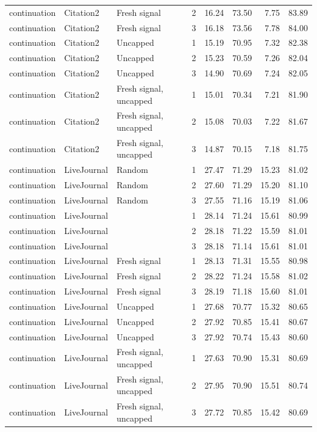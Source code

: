\begin{table}[t]
\begin{tabular}{lllrrrrr}
continuation & Citation2 & Fresh signal & 2 & 16.24 & 73.50 & 7.75 & 83.89 \\
continuation & Citation2 & Fresh signal & 3 & 16.18 & 73.56 & 7.78 & 84.00 \\
continuation & Citation2 & Uncapped & 1 & 15.19 & 70.95 & 7.32 & 82.38 \\
continuation & Citation2 & Uncapped & 2 & 15.23 & 70.59 & 7.26 & 82.04 \\
continuation & Citation2 & Uncapped & 3 & 14.90 & 70.69 & 7.24 & 82.05 \\
continuation & Citation2 & Fresh signal, uncapped & 1 & 15.01 & 70.34 & 7.21 & 81.90 \\
continuation & Citation2 & Fresh signal, uncapped & 2 & 15.08 & 70.03 & 7.22 & 81.67 \\
continuation & Citation2 & Fresh signal, uncapped & 3 & 14.87 & 70.15 & 7.18 & 81.75 \\
continuation & LiveJournal & Random & 1 & 27.47 & 71.29 & 15.23 & 81.02 \\
continuation & LiveJournal & Random & 2 & 27.60 & 71.29 & 15.20 & 81.10 \\
continuation & LiveJournal & Random & 3 & 27.55 & 71.16 & 15.19 & 81.06 \\
continuation & LiveJournal & \ours{} & 1 & 28.14 & 71.24 & 15.61 & 80.99 \\
continuation & LiveJournal & \ours{} & 2 & 28.18 & 71.22 & 15.59 & 81.01 \\
continuation & LiveJournal & \ours{} & 3 & 28.18 & 71.14 & 15.61 & 81.01 \\
continuation & LiveJournal & Fresh signal & 1 & 28.13 & 71.31 & 15.55 & 80.98 \\
continuation & LiveJournal & Fresh signal & 2 & 28.22 & 71.24 & 15.58 & 81.02 \\
continuation & LiveJournal & Fresh signal & 3 & 28.19 & 71.18 & 15.60 & 81.01 \\
continuation & LiveJournal & Uncapped & 1 & 27.68 & 70.77 & 15.32 & 80.65 \\
continuation & LiveJournal & Uncapped & 2 & 27.92 & 70.85 & 15.41 & 80.67 \\
continuation & LiveJournal & Uncapped & 3 & 27.92 & 70.74 & 15.43 & 80.60 \\
continuation & LiveJournal & Fresh signal, uncapped & 1 & 27.63 & 70.90 & 15.31 & 80.69 \\
continuation & LiveJournal & Fresh signal, uncapped & 2 & 27.95 & 70.90 & 15.51 & 80.74 \\
continuation & LiveJournal & Fresh signal, uncapped & 3 & 27.72 & 70.85 & 15.42 & 80.69 \\
    \bottomrule
  \end{tabular}
\end{table}
